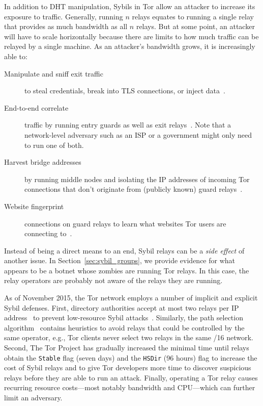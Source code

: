 In addition to DHT manipulation, Sybils in Tor allow an attacker to increase its
exposure to traffic.  Generally, running $n$ relays equates to running a single
relay that provides as much bandwidth as all $n$ relays.  But at some point, an
attacker will have to scale horizontally because there are limits to how much
traffic can be relayed by a single machine.  As an attacker's bandwidth grows,
it is increasingly able to:
\begin{description}
	\item[Manipulate and sniff exit traffic] to steal credentials, break into
		TLS connections, or inject data~\cite{Winter2014a}.
	\item[End-to-end correlate] traffic by running entry guards as well as exit
		relays~\cite{Johnson2013a}.  Note that a network-level adversary such as
		an ISP or a government might only need to run one of both.
	\item[Harvest bridge addresses] by running middle nodes and isolating the
		IP addresses of incoming Tor connections that don't originate from
		(publicly known) guard relays~\cite{Ling2012a}.
	\item[Website fingerprint] connections on guard relays to learn what
		websites Tor users are connecting to~\cite{Juarez2014a}.
\end{description}

Instead of being a direct means to an end, Sybil relays can be a \emph{side
effect} of another issue.  In Section~\ref{sec:sybil_groups}, we provide
evidence for what appears to be a botnet whose zombies are running Tor relays.
In this case, the relay operators are probably not aware of the relays they are
running.

As of November 2015, the Tor network employs a number of implicit and explicit
Sybil defenses.  First, directory authorities accept at most two relays per IP
address~\cite{Bauer2007b} to prevent low-resource Sybil
attacks~\cite{Bauer2007a}.  Similarly, the path selection
algorithm~\cite{path-spec} contains heuristics to avoid relays that could be
controlled by the same operator, e.g., Tor clients never select two relays in
the same /16 network.  Second, The Tor Project has gradually increased the
minimal time until relays obtain the \texttt{Stable} flag (seven days) and the
\texttt{HSDir} (96 hours) flag to increase the cost of Sybil relays and to give
Tor developers more time to discover suspicious relays before they are able to
run an attack.  Finally, operating a Tor relay causes recurring resource
costs---most notably bandwidth and CPU---which can further limit an adversary.

